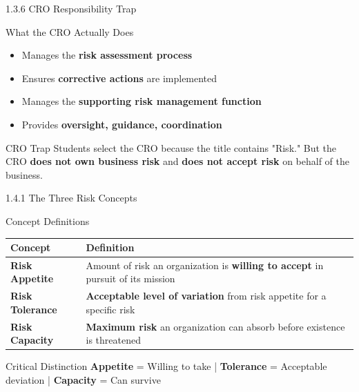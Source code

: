 \documentclass{beamer}
\begin{document}
	\begin{frame}{1.3.6 CRO Responsibility Trap}
		\begin{block}{What the CRO Actually Does}
			\begin{itemize}
				\item Manages the \textbf{risk assessment process}
				\item Ensures \textbf{corrective actions} are implemented
				\item Manages the \textbf{supporting risk management function}
				\item Provides \textbf{oversight, guidance, coordination}
			\end{itemize}
		\end{block}
		\begin{alertblock}{CRO Trap}
			Students select the CRO because the title contains "Risk." But the CRO \textbf{does not own business risk} and \textbf{does not accept risk} on behalf of the business.
		\end{alertblock}
	\end{frame}
	
	\begin{frame}{1.4.1 The Three Risk Concepts}
		\begin{block}{Concept Definitions}
			\begin{tabular}{|p{3cm}|p{8cm}|}
				\hline
				\textbf{Concept} & \textbf{Definition} \\
				\hline
				\textbf{Risk Appetite} & Amount of risk an organization is \textbf{willing to accept} in pursuit of its mission \\
				\hline
				\textbf{Risk Tolerance} & \textbf{Acceptable level of variation} from risk appetite for a specific risk \\
				\hline
				\textbf{Risk Capacity} & \textbf{Maximum risk} an organization can absorb before existence is threatened \\
				\hline
			\end{tabular}
		\end{block}
		\begin{alertblock}{Critical Distinction}
			\textbf{Appetite} = Willing to take | \textbf{Tolerance} = Acceptable deviation | \textbf{Capacity} = Can survive
		\end{alertblock}
	\end{frame}
	
\end{document}
